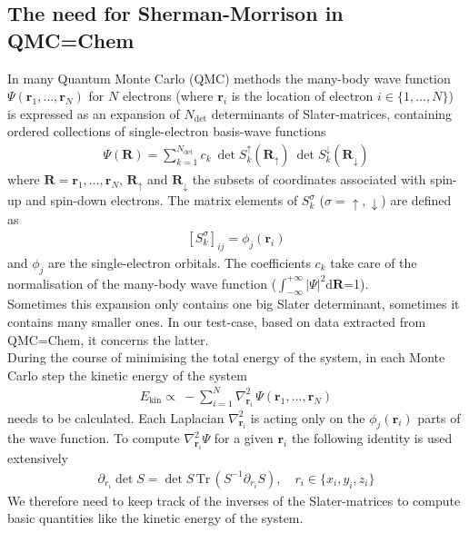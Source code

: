 \documentclass[11pt]{article}
\numberwithin{figure}{section}
\numberwithin{table}{section}
\begin{document}
		\subsection{The need for Sherman-Morrison in QMC=Chem}
			In many Quantum Monte Carlo (QMC) methods the many-body wave function $\Psi(\mathbf{r}_1,\ldots,\mathbf{r}_N)$ for $N$ electrons (where $\mathbf{r}_i$ is the location of electron $i\in\{1,\ldots ,N\}$) is expressed as an expansion of $N_\mathrm{det}$ determinants of Slater-matrices, containing ordered collections of single-electron basis-wave functions
			\begin{align}\label{eqn:mbwf}
				\Psi(\mathbf{R}) = \sum_{k=1}^{N_\mathrm{det}}c_k\:\det S_k^\uparrow(\mathbf{R}_\uparrow)\:\det S_k^\downarrow(\mathbf{R}_\downarrow)
			\end{align}
			where $\mathbf{R}=\mathbf{r}_1,\ldots,\mathbf{r}_N$, $\mathbf{R}_\uparrow$ and $\mathbf{R}_\downarrow$ the subsets of coordinates associated with spin-up and spin-down electrons. The matrix elements of $S_k^\sigma$ ($\sigma=\uparrow,\downarrow$) are defined as 
			\begin{align}
				\left[S_k^\sigma\right]_{ij} = \phi_j(\mathbf{r}_i)
			\end{align}
			and $\phi_j$ are the single-electron orbitals. The coefficients $c_k$ take care of the normalisation of the many-body wave function ($\int_{-\infty}^{+\infty}|\Psi|^2\mathrm{d}\mathbf{R}$=1).\\
			
			Sometimes this expansion only contains one big Slater determinant, sometimes it contains many smaller ones. In our test-case, based on data extracted from QMC=Chem, it concerns the latter.\\
				
			During the course of minimising the total energy of the system, in each Monte Carlo step the kinetic energy of the system
			\begin{align}
				E_\mathrm{kin} \propto\:-\!\sum_{i=1}^{N}\nabla^2_{\mathbf{r}_i}\,\Psi(\mathbf{r}_1,\ldots,\mathbf{r}_N)
			\end{align}
			needs to be calculated. Each Laplacian $\nabla^2_{\mathbf{r}_i}$ is acting only on the $\phi_j(\mathbf{r}_i)$ parts of the wave function. To compute $\nabla^2_{\mathbf{r}_i}\Psi$ for a given $\mathbf{r}_i$ the following identity is used extensively
			\begin{align}
				\partial_{r_i}\det S=\det S\,\mathrm{Tr}\,(S^{-1}\partial_{r_i} S),\quad r_i\in\{x_i,y_i,z_i\}
			\end{align}
			We therefore need to keep track of the inverses of the Slater-matrices to compute basic quantities like the kinetic energy of the system.\\
			
\end{document}
